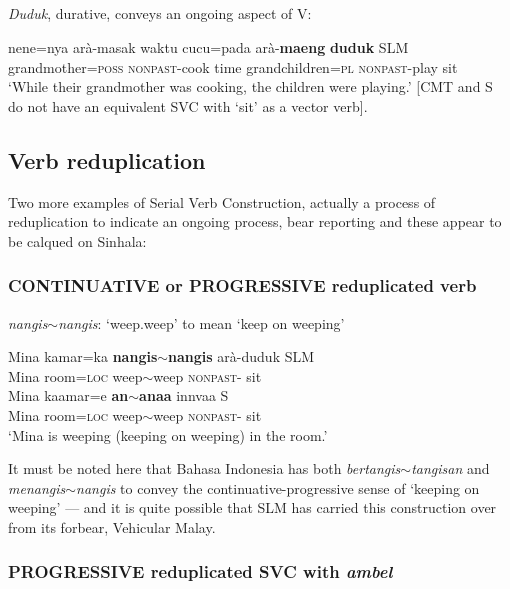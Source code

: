 \subsection{}
{\em Duduk}, durative, conveys an ongoing aspect of V:

\ea\label{jaffar:ex:64}
\gll nene=nya arà-masak waktu cucu=pada arà-\textbf{maeng} \textbf{duduk} SLM \\
 grandmother=\textsc{poss} \textsc{nonpast}-cook time grandchildren=\textsc{pl} \textsc{nonpast}-play sit\\
`While their grandmother was cooking, the children were playing.'
 [CMT and S do not have an equivalent SVC with `sit' as a vector verb].
\z

\subsection{Verb reduplication}
Two more examples of Serial Verb Construction, actually a process of reduplication to indicate an ongoing process, bear reporting and these appear to be calqued on Sinhala:

\subsubsection{CONTINUATIVE or PROGRESSIVE reduplicated verb}
 \textit{nangis}\textit{${\sim}$}\textit{nangis}: `weep.weep' to mean `keep on weeping'

\ea
\ea\label{jaffar:ex:65}
\gll Mina kamar=ka \textbf{nangis${\sim}$nangis} arà-duduk  SLM \\
 Mina room=\textsc{loc}  weep${\sim}$weep \textsc{nonpast}- sit\\
\ex%
\gll Mina kaamar=e \textbf{an{\dz}{\E}${\sim}$an{\dz}aa} inn{\E}vaa  S \\
 Mina room=\textsc{loc}  weep${\sim}$weep \textsc{nonpast}- sit\\
`Mina is weeping (keeping on weeping) in the room.'
\z
\z

It must be noted here that Bahasa Indonesia has both \textit{bertangis${\sim}$tangisan} and \textit{menangis${\sim}$nangis} to convey the continuative-progressive sense of `keeping on weeping' --- and it is quite possible that SLM has carried this construction over from its forbear, Vehicular Malay. 

\subsubsection{PROGRESSIVE reduplicated SVC with \textit{ambel}}

